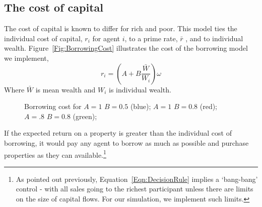 



\subsection{The cost of capital}
The cost of capital is known to differ for rich and poor. This model ties the individual cost of capital,  $r_i$ for agent $i$, to a prime rate, $\bar r$ , and to individual wealth. Figure~\ref{Fig:BorrowingCost} illustrates the cost of the borrowing model we implement, 
 \[ r_i = (A + B \frac{\bar{W}}{W_i})\omega\]
Where $\bar{W}$ is mean wealth and $W_i$ is individual wealth. 
\begin{figure}[htbp]
\begin{center}
\caption{Borrowing cost for  $A=1$  $B=0.5$ (blue);  $A=1$  $B=0.8$ (red);  $A=.8$  $B=0.8$ (green);}
\label{Fig:CapitalCost}
\end{center}
\end{figure}
If the expected return on a property is greater than the individual cost of borrowing, it would pay any agent to borrow as much as possible and purchase properties as they can available.\footnote{As pointed out previously,  Equation~\ref{Eqn:DecisionRule} implies a `bang-bang' control - with all sales going to the richest participant unless there are limits on the size of capital flows. For our simulation, we implement such limits. } 
 
